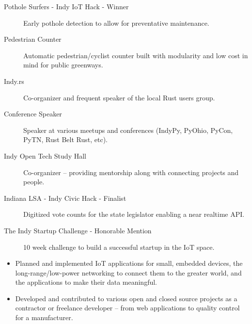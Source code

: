 \documentclass[letterpaper]{article}        %
\begin{document}

  \begin{description}
    
            \item[Pothole Surfers - Indy IoT Hack - Winner] Early pothole detection to allow for preventative maintenance.
        
    
            \item[Pedestrian Counter] Automatic pedestrian/cyclist counter built with modularity and low cost in mind for public greenways.
        
    
            \item[Indy.rs] Co-organizer and frequent speaker of the local Rust users group.
        
    
            \item[Conference Speaker] Speaker at various meetups and conferences (IndyPy, PyOhio, PyCon, PyTN, Rust Belt Rust, etc).
        
    
            \item[Indy Open Tech Study Hall] Co-organizer -- providing mentorship along with connecting projects and people.
        
    
            \item[Indiana LSA - Indy Civic Hack - Finalist] Digitized vote counts for the state legislator enabling a near realtime API.
        
    
            \item[The Indy Startup Challenge - Honorable Mention] 10 week challenge to build a successful startup in the IoT space.
        
    
  \end{description}


  
    \begin{itemize}
    \item Planned and implemented IoT applications for small, embedded devices, the long-range/low-power networking to connect them to the greater world, and the applications to make their data meaningful.
    \end{itemize}
  
    \begin{itemize}
    \item Developed and contributed to various open and closed source projects as a contractor or freelance developer -- from web applications to quality control for a manufacturer.
    \end{itemize}
  
\end{document}
